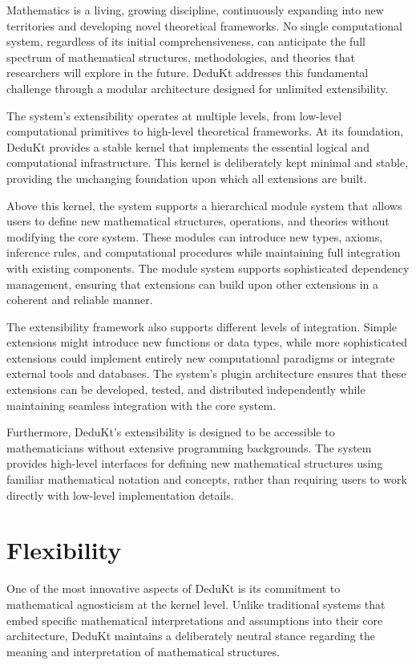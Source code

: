 Mathematics is a living, growing discipline, continuously expanding into new territories and developing novel theoretical frameworks.
No single computational system, regardless of its initial comprehensiveness, can anticipate the full spectrum of mathematical structures, methodologies, and theories that researchers will explore in the future.
DeduKt addresses this fundamental challenge through a modular architecture designed for unlimited extensibility.

The system's extensibility operates at multiple levels, from low-level computational primitives to high-level theoretical frameworks.
At its foundation, DeduKt provides a stable kernel that implements the essential logical and computational infrastructure.
This kernel is deliberately kept minimal and stable, providing the unchanging foundation upon which all extensions are built.

Above this kernel, the system supports a hierarchical module system that allows users to define new mathematical structures, operations, and theories without modifying the core system.
These modules can introduce new types, axioms, inference rules, and computational procedures while maintaining full integration with existing components.
The module system supports sophisticated dependency management, ensuring that extensions can build upon other extensions in a coherent and reliable manner.

The extensibility framework also supports different levels of integration.
Simple extensions might introduce new functions or data types, while more sophisticated extensions could implement entirely new computational paradigms or integrate external tools and databases.
The system's plugin architecture ensures that these extensions can be developed, tested, and distributed independently while maintaining seamless integration with the core system.

Furthermore, DeduKt's extensibility is designed to be accessible to mathematicians without extensive programming backgrounds.
The system provides high-level interfaces for defining new mathematical structures using familiar mathematical notation and concepts, rather than requiring users to work directly with low-level implementation details.

\section{Flexibility}\label{sec:flexibility}

One of the most innovative aspects of DeduKt is its commitment to mathematical agnosticism at the kernel level.
Unlike traditional systems that embed specific mathematical interpretations and assumptions into their core architecture, DeduKt maintains a deliberately neutral stance regarding the meaning and interpretation of mathematical structures.

